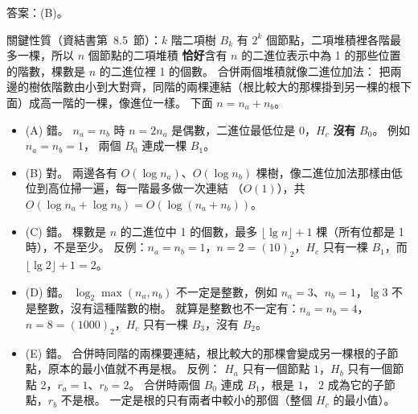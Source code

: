\begin{pastsoln}
答案：(B)。

關鍵性質（資結書第~8.5~節）：$k$ 階二項樹 $B_k$ 有 $2^k$ 個節點，二項堆積裡各階最多一棵，所以 $n$ 個節點的二項堆積
\textbf{恰好}含有 $n$ 的二進位表示中為 1 的那些位置的階數，棵數是 $n$ 的二進位裡 1 的個數。 合併兩個堆積就像二進位加法：
把兩邊的樹依階數由小到大對齊，同階的兩棵連結（根比較大的那棵掛到另一棵的根下面）成高一階的一棵，像進位一樣。
下面 $n = n_a + n_b$。

\begin{itemize}
\item (A) 錯。 $n_a = n_b$ 時 $n = 2n_a$ 是偶數，二進位最低位是 0，$H_c$ \textbf{沒有} $B_0$。 例如 $n_a = n_b = 1$，
兩個 $B_0$ 連成一棵 $B_1$。
\item (B) 對。 兩邊各有 $O(\log n_a)$、$O(\log n_b)$ 棵樹，像二進位加法那樣由低位到高位掃一遍，每一階最多做一次連結
（$O(1)$），共 $O(\log n_a + \log n_b) = O(\log(n_a + n_b))$。
\item (C) 錯。 棵數是 $n$ 的二進位中 1 的個數，最多 $\lfloor \lg n \rfloor + 1$ 棵（所有位都是 1 時），不是至少。
反例：$n_a = n_b = 1$，$n = 2 = (10)_2$，$H_c$ 只有一棵 $B_1$，而 $\lfloor \lg 2 \rfloor + 1 = 2$。
\item (D) 錯。 $\log_2 \max(n_a, n_b)$ 不一定是整數，例如 $n_a = 3$、$n_b = 1$，$\lg 3$ 不是整數，沒有這種階數的樹。
就算是整數也不一定有：$n_a = n_b = 4$，$n = 8 = (1000)_2$，$H_c$ 只有一棵 $B_3$，沒有 $B_2$。
\item (E) 錯。 合併時同階的兩棵要連結，根比較大的那棵會變成另一棵根的子節點，原本的最小值就不再是根。 反例：
$H_a$ 只有一個節點 $1$，$H_b$ 只有一個節點 $2$，$r_a = 1$、$r_b = 2$。 合併時兩個 $B_0$ 連成 $B_1$，根是 $1$，
$2$ 成為它的子節點，$r_b$ 不是根。 一定是根的只有兩者中較小的那個（整個 $H_c$ 的最小值）。
\end{itemize}
\end{pastsoln}
